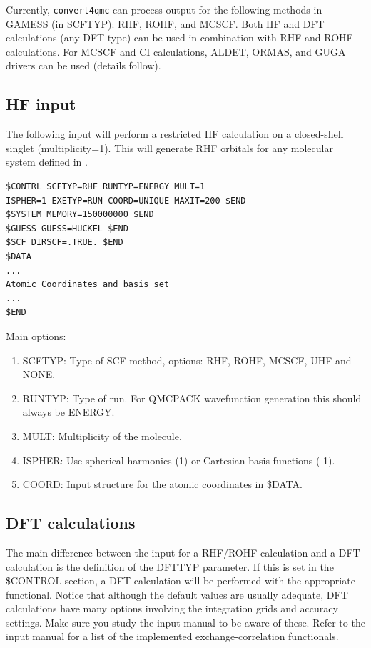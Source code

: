 Currently, \texttt{convert4qmc} can process output for the following methods in GAMESS (in
SCFTYP): RHF, ROHF, and MCSCF. Both HF and DFT calculations (any DFT
type) can be used in combination with RHF and ROHF calculations. For MCSCF and CI
calculations, ALDET, ORMAS, and GUGA drivers can be used (details follow).


\subsection{HF input}
The following input will perform a restricted HF calculation on a closed-shell singlet 
(multiplicity=1). This will generate RHF orbitals for any molecular system defined in 
.

\begin{lstlisting}[style=GAMESS]
$CONTRL SCFTYP=RHF RUNTYP=ENERGY MULT=1
ISPHER=1 EXETYP=RUN COORD=UNIQUE MAXIT=200 $END
$SYSTEM MEMORY=150000000 $END
$GUESS GUESS=HUCKEL $END
$SCF DIRSCF=.TRUE. $END
$DATA
...
Atomic Coordinates and basis set
...
$END
\end{lstlisting}

Main options:
\begin{enumerate}
  \item{SCFTYP: Type of SCF method, options: RHF, ROHF, MCSCF, UHF and NONE.}
  \item{RUNTYP: Type of run. For QMCPACK wavefunction generation this should always be ENERGY.}
  \item{MULT: Multiplicity of the molecule.}
  \item{ISPHER: Use spherical harmonics (1) or Cartesian basis functions (-1).}
  \item{COORD: Input structure for the atomic coordinates in \$DATA.}
\end{enumerate}


\subsection{DFT calculations}
The main difference between the input for a RHF/ROHF calculation and a DFT calculation 
is the definition of the DFTTYP parameter. If this is set in the \$CONTROL
section, a DFT calculation will be performed with the appropriate functional. Notice that
although the default values are usually adequate, DFT calculations have many options involving
the integration grids and accuracy settings. Make sure you study the input manual to be
aware of these. Refer to the input manual for a list of the implemented exchange-correlation
functionals.


